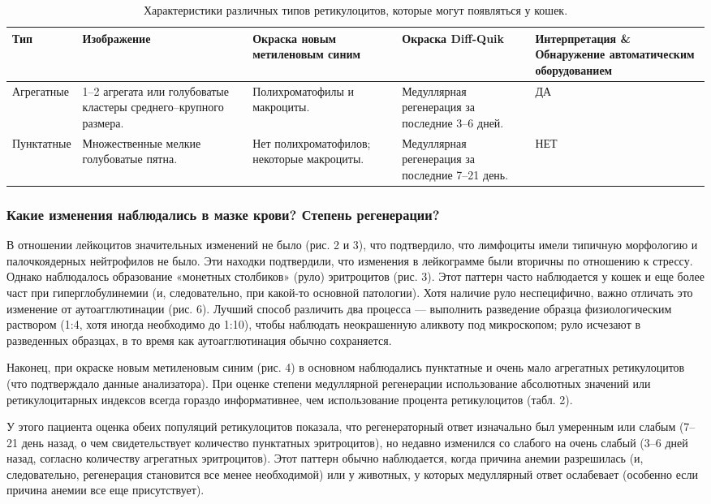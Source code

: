 \documentclass[a4paper,12pt]{book}
\begin{document}
\begin{table}[htbp]
\centering
\caption{Характеристики различных типов ретикулоцитов, которые могут появляться у кошек.}
\begin{tabular}{p{2.5cm}p{3cm}p{2.5cm}p{2.5cm}p{2cm}}
\toprule
Тип & Изображение & Окраска новым метиленовым синим & Окраска Diff-Quik & Интерпретация \& Обнаружение автоматическим оборудованием \\
\midrule
Агрегатные & 1--2 агрегата или голубоватые кластеры среднего--крупного размера. & Полихроматофилы и макроциты. & Медуллярная регенерация за последние 3--6 дней. & ДА \\
Пунктатные & Множественные мелкие голубоватые пятна. & Нет полихроматофилов; некоторые макроциты. & Медуллярная регенерация за последние 7--21 день. & НЕТ \\
\bottomrule
\end{tabular}
\end{table}

\subsubsection*{Какие изменения наблюдались в мазке крови? Степень регенерации?}
В отношении лейкоцитов значительных изменений не было (рис. 2 и 3), что подтвердило, что лимфоциты имели типичную морфологию и палочкоядерных нейтрофилов не было. Эти находки подтвердили, что изменения в лейкограмме были вторичны по отношению к стрессу. Однако наблюдалось образование «монетных столбиков» (руло) эритроцитов (рис. 3). Этот паттерн часто наблюдается у кошек и еще более част при гиперглобулинемии (и, следовательно, при какой-то основной патологии). Хотя наличие руло неспецифично, важно отличать это изменение от аутоагглютинации (рис. 6). Лучший способ различить два процесса — выполнить разведение образца физиологическим раствором (1:4, хотя иногда необходимо до 1:10), чтобы наблюдать неокрашенную аликвоту под микроскопом; руло исчезают в разведенных образцах, в то время как аутоагглютинация обычно сохраняется.

Наконец, при окраске новым метиленовым синим (рис. 4) в основном наблюдались пунктатные и очень мало агрегатных ретикулоцитов (что подтверждало данные анализатора). При оценке степени медуллярной регенерации использование абсолютных значений или ретикулоцитарных индексов всегда гораздо информативнее, чем использование процента ретикулоцитов (табл. 2).

У этого пациента оценка обеих популяций ретикулоцитов показала, что регенераторный ответ изначально был умеренным или слабым (7--21 день назад, о чем свидетельствует количество пунктатных эритроцитов), но недавно изменился со слабого на очень слабый (3--6 дней назад, согласно количеству агрегатных эритроцитов). Этот паттерн обычно наблюдается, когда причина анемии разрешилась (и, следовательно, регенерация становится все менее необходимой) или у животных, у которых медуллярный ответ ослабевает (особенно если причина анемии все еще присутствует).
\end{document}
